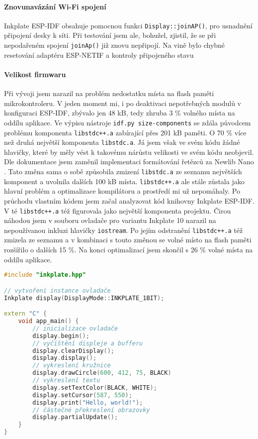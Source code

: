 \paragraph{Znovunavázání Wi-Fi spojení} Inkplate ESP-IDF obsahuje pomocnou funkci \lstinline|Display::joinAP()|, pro usnadnění připojení desky k síti. Při testování jsem ale, bohužel, zjistil, že se při nepodařeném spojení \lstinline|joinAp()| již znovu nepřipojí. Na vině bylo chybné resetování adaptéru ESP-NETIF a kontroly připojeného stavu \cite{MenuconfigVariantSelection}

\paragraph{Velikost firmwaru} Při vývoji jsem narazil na problém nedostatku místa na flash paměti mikrokontroleru. V jeden moment mi, i po deaktivaci nepotřebných modulů v konfiguraci ESP-IDF, zbývalo jen 48 kB, tedy zhruba 3 \% volného místa na oddílu aplikace. Ve výpisu nástroje \lstinline|idf.py size-components| se zdála původcem problému komponenta \lstinline|libstdc++.a| zabírající přes 201 kB paměti. O 70 \% více než druhá největší komponenta \lstinline|libstdc.a|. Já jsem však ve svém kódu žádné hlavičky, které by měly vést k takovému nárůstu velikosti ve svém kódu neobjevil. Dle dokumentace jsem zaměnil implementaci formátování řetězců za Newlib Nano \cite{MinimizingBinarySize}. Tato změna sama o sobě způsobila zmizení \lstinline|libstdc.a| ze seznamu největších komponent a uvolnila dalších 100 kB místa. \lstinline|libstdc++.a| ale stále zůstala jako hlavní problém a optimalizace kompilátoru a prostředí mi už nepomáhaly. Po průchodu vlastním kódem jsem začal analyzovat kód knihovny Inkplate ESP-IDF. V té \lstinline|libstdc++.a| též figurovala jako největší komponenta projektu. Čirou náhodou jsem v souboru ovladače pro variantu Inkplate 10 narazil na nepoužívanou inkluzi hlavičky \lstinline|iostream|. Po jejím odstranění \lstinline|libstdc++.a| též zmizela ze seznamu a v kombinaci s touto změnou se volné místo na flash paměti rozšířilo o dalších 15 \%. Na konci optimalizací jsem skončil s 26 \% volné místa na oddílu aplikace.


\begin{lstlisting}[label=src:esp-idf-hello-world,language=C++,caption={Ukázka programu pro vykreslení kružnice a Hello World řetězce pomocí ESP-IDF knihovny}]
#include "inkplate.hpp"

// vytvoření instance ovladače
Inkplate display(DisplayMode::INKPLATE_1BIT);

extern "C" {
    void app_main() {
        // inicializace ovladače
        display.begin();
        // vyčištění displeje a bufferu
        display.clearDisplay();
        display.display();
        // vykreslení kružnice
        display.drawCircle(600, 412, 75, BLACK)
        // vykreslení textu
        display.setTextColor(BLACK, WHITE);
        display.setCursor(587, 550);
        display.print("Hello, world!");
        // částečné překreslení obrazovky
        display.partialUpdate();
    }
}
\end{lstlisting}

